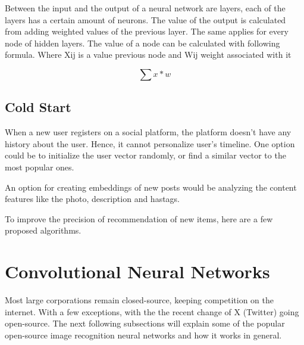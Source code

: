 Between the input and the output of a neural network are layers, each of the layers has a certain amount of neurons. \cite{GAO2020409} The value of the output is calculated from adding weighted values of the previous layer. The same applies for every node of hidden layers. The value of a node can be calculated with following formula. Where Xij is a value previous node and Wij weight associated with it

\[ \sum x * w \]

\subsection{Cold Start}\label{cold-start}

When a new user registers on a social platform, the platform doesn't have any history about the user. Hence, it cannot personalize user's timeline. One option could be to initialize the user vector randomly, or find a similar vector to the most popular ones.

An option for creating embeddings of new posts would be analyzing the content features like the photo, description and hastags.

To improve the precision of recommendation of new items, here are a few proposed algorithms. 

\section{Convolutional Neural Networks}\label{cnn}

Most large corporations remain closed-source, keeping competition on the internet. With a few exceptions, with the the recent change of X (Twitter) going open-source. The next following subsections will explain some of the popular open-source image recognition neural networks and how it works in general.

